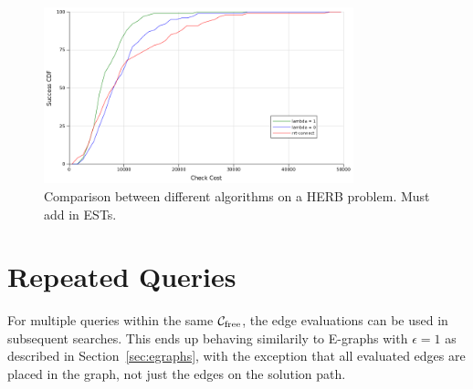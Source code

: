 \begin{figure}
\centering
\includegraphics[width=0.8\textwidth]{figs/timegreedy-herbstep1-comparison-cdfs.png}
\caption{Comparison between different algorithms on a HERB problem.
   Must add in ESTs.}
\label{fig:herb-comparison-cdfs}
\end{figure}

\section{Repeated Queries}

For multiple queries within the same
$\mathcal{C}_{\mbox{\scriptsize free}}$,
the edge evaluations can be used in subsequent searches.
This ends up behaving similarily to E-graphs \cite{phillips2012egraphs}
with $\epsilon=1$
as described in Section~\ref{sec:egraphs},
with the exception that all evaluated edges are placed in the graph,
not just the edges on the solution path.
